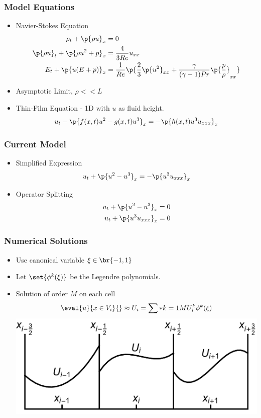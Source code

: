 \documentclass[10pt]{beamer}
\begin{document}
    \begin{frame}
      \frametitle{Model Equations}
      \begin{itemize}
        \item Navier-Stokes Equation
          \begin{align*}
            \rho_t + \p{\rho u}_x &= 0 \\
            \p{\rho u}_t + \p{\rho u^2 + p}_x &=  \frac{4}{3Re} u_{xx} \\
            E_t + \p{u (E + p)}_x &= \frac{1}{Re} \p{\frac{2}{3} \p{u^2}_{xx} + \frac{\gamma}{(\gamma - 1)Pr} \p{\frac{p}{\rho}}_{xx}}
          \end{align*}
        \item Asymptotic Limit, $\rho << L$
        \item Thin-Film Equation - 1D with $u$ as fluid height.
          \[
            u_t + \p{f(x, t) u^2 - g(x, t) u^3}_x = -\p{h(x, t) u^3 u_{xxx}}_x
          \]
      \end{itemize}
    \end{frame}

    \begin{frame}
      \frametitle{Current Model}
      \begin{itemize}
        \item Simplified Expression
          \[
            u_t + \p{u^2 - u^3}_x = -\p{u^3 u_{xxx}}_x
          \]

        \item Operator Splitting
          \begin{align*}
            u_t + \p{u^2 - u^3}_x &= 0 \\
            u_t + \p{u^3 u_{xxx}}_x &= 0
          \end{align*}
      \end{itemize}
    \end{frame}


    \begin{frame}
      \frametitle{Numerical Solutions}
      \begin{itemize}
        \item Use canonical variable $\xi \in \br{-1, 1}$
        \item Let $\set{\phi^k(\xi)}$ be the Legendre polynomials.

        \item Solution of order $M$ on each cell
          \[
            \eval{u}{x \in V_i}{} \approx U_i = \sum*{k = 1}{M}{U_i^k \phi^k(\xi)}
          \]
          \includegraphics[scale=0.35]{Figures/DG.pdf}
      \end{itemize}
    \end{frame}
\end{document}
